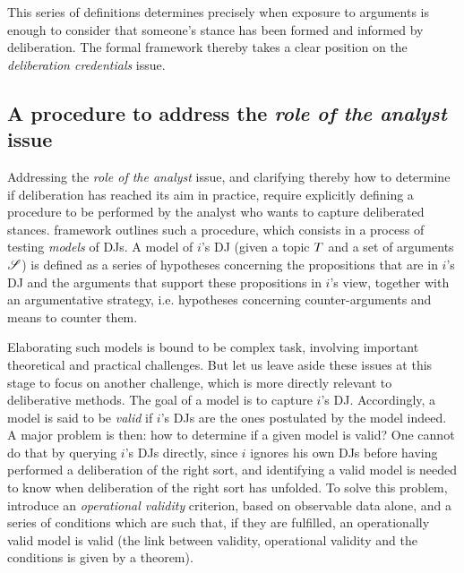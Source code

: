 \documentclass[version=3.21, pagesize, twoside=off, bibliography=totoc, DIV=calc, fontsize=12pt, a4paper, french, english]{scrartcl}
\begin{document}
This series of definitions determines precisely when exposure to arguments is enough to consider that someone’s stance has been formed and informed by deliberation. The formal framework thereby takes a clear position on the \emph{deliberation credentials} issue.

\subsection{A procedure to address the \emph{role of the analyst} issue}
Addressing the \emph{role of the analyst} issue, and clarifying thereby how to determine if deliberation has reached its aim in practice,  require explicitly defining a procedure to be performed by the analyst who wants to capture deliberated stances.  framework outlines such a procedure, which consists in a process of testing \emph{models} of \acp{DJ}. A model of $i$’s \ac{DJ} (given a topic $T$ and a set of arguments $\mathscr{S}$) is defined as a series of hypotheses concerning the propositions that are in $i$’s \ac{DJ} and the arguments that support these propositions in $i$’s view, together with an argumentative strategy, i.e. hypotheses concerning counter-arguments and means to counter them.

Elaborating such models is bound to be complex task, involving important theoretical and practical challenges. But let us leave aside these issues at this stage to focus on another challenge, which is more directly relevant to deliberative methods. 
The goal of a model is to capture $i$’s \ac{DJ}. Accordingly, a model is said to be \emph{valid} if $i$’s \acp{DJ} are the ones postulated by the model indeed. A major problem is then: how to determine if a given model is valid?
One cannot do that by querying $i$’s \acp{DJ} directly, since $i$ ignores his own \acp{DJ} before having performed a deliberation of the right sort, and identifying a valid model is needed to know when deliberation of the right sort has unfolded. To solve this problem, \citet{cailloux_formal_2019} introduce an \emph{operational validity} criterion, based on observable data alone, and a series of conditions which are such that, if they are fulfilled, an operationally valid model is valid (the link between validity, operational validity and the conditions is given by a theorem).
\end{document}
